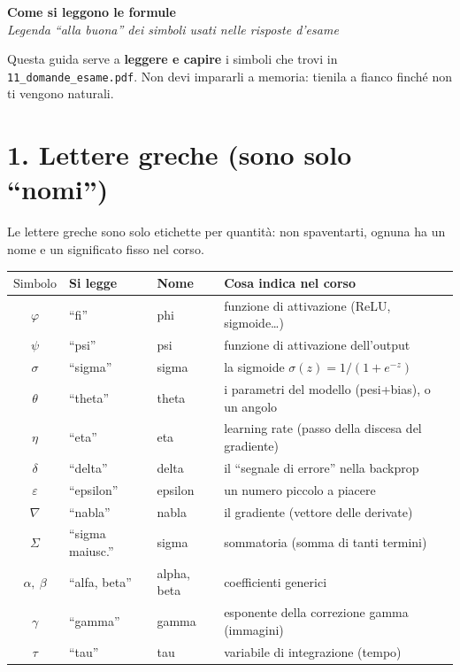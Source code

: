 \documentclass[11pt,a4paper]{article}
\begin{document}
\begin{center}
{\Large\bfseries Come si leggono le formule}\\[2pt]
{\itshape Legenda \enquote{alla buona} dei simboli usati nelle risposte d'esame}
\end{center}

Questa guida serve a \textbf{leggere e capire} i simboli che trovi in
\texttt{11\_domande\_esame.pdf}. Non devi impararli a memoria: tienila a fianco
finché non ti vengono naturali.

\section*{1. Lettere greche (sono solo \enquote{nomi})}

Le lettere greche sono solo etichette per quantità: non spaventarti, ognuna ha
un nome e un significato fisso nel corso.

\begin{center}
\begin{tabular}{>{$}c<{$} l l p{7.2cm}}
\toprule
\textrm{Simbolo} & \textrm{Si legge} & \textrm{Nome} & \textrm{Cosa indica nel corso} \\
\midrule
\varphi & \enquote{fi} & phi & funzione di attivazione (ReLU, sigmoide\dots) \\
\psi & \enquote{psi} & psi & funzione di attivazione dell'output \\
\sigma & \enquote{sigma} & sigma & la sigmoide $\sigma(z)=1/(1+e^{-z})$ \\
\theta & \enquote{theta} & theta & i parametri del modello (pesi+bias), o un angolo \\
\eta & \enquote{eta} & eta & learning rate (passo della discesa del gradiente) \\
\delta & \enquote{delta} & delta & il \enquote{segnale di errore} nella backprop \\
\varepsilon & \enquote{epsilon} & epsilon & un numero piccolo a piacere \\
\nabla & \enquote{nabla} & nabla & il gradiente (vettore delle derivate) \\
\Sigma & \enquote{sigma maiusc.} & sigma & sommatoria (somma di tanti termini) \\
\alpha,\ \beta & \enquote{alfa, beta} & alpha, beta & coefficienti generici \\
\gamma & \enquote{gamma} & gamma & esponente della correzione gamma (immagini) \\
\tau & \enquote{tau} & tau & variabile di integrazione (tempo) \\
\bottomrule
\end{tabular}
\end{center}
\end{document}
